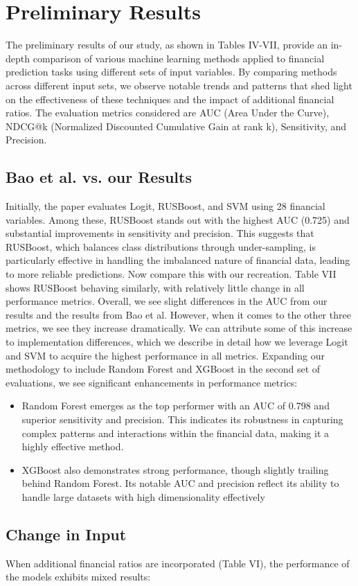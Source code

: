 \documentclass[conference]{IEEEtran}
\begin{document}
\section{Preliminary Results} The preliminary results of our study, as shown in Tables IV-VII, provide an in-depth comparison of various machine learning methods applied to financial prediction tasks using different sets of input variables. By comparing methods across different input sets, we observe notable trends and patterns that shed light on the effectiveness of these techniques and the impact of additional financial ratios. The evaluation metrics considered are AUC (Area Under the Curve), NDCG@k (Normalized Discounted Cumulative Gain at rank k), Sensitivity, and Precision. \subsection{Bao et al. vs. our Results}Initially, the paper evaluates Logit, RUSBoost, and SVM using 28 financial variables. Among these, RUSBoost stands out with the highest AUC (0.725) and substantial improvements in sensitivity and precision. This suggests that RUSBoost, which balances class distributions through under-sampling, is particularly effective in handling the imbalanced nature of financial data, leading to more reliable predictions. Now compare this with our recreation. Table VII shows RUSBoost behaving similarly, with relatively little change in all performance metrics. Overall, we see slight differences in the AUC from our results and the results from Bao et al. However, when it comes to the other three metrics, we see they increase dramatically. We can attribute some of this increase to implementation differences, which we describe in detail how we leverage Logit and SVM to acquire the highest performance in all metrics. Expanding our methodology to include Random Forest and XGBoost in the second set of evaluations, we see significant enhancements in performance metrics: \begin{itemize} 
\item Random Forest emerges as the top performer with an AUC of 0.798 and superior sensitivity and precision. This indicates its robustness in capturing complex patterns and interactions within the financial data, making it a highly effective method.
\item XGBoost also demonstrates strong performance, though slightly trailing behind Random Forest. Its notable AUC and precision reflect its ability to handle large datasets with high dimensionality effectively \end{itemize}\subsection{Change in Input} When additional financial ratios are incorporated (Table VI), the performance of the models exhibits mixed results:\begin{itemize}

\end{itemize}
\end{document}
